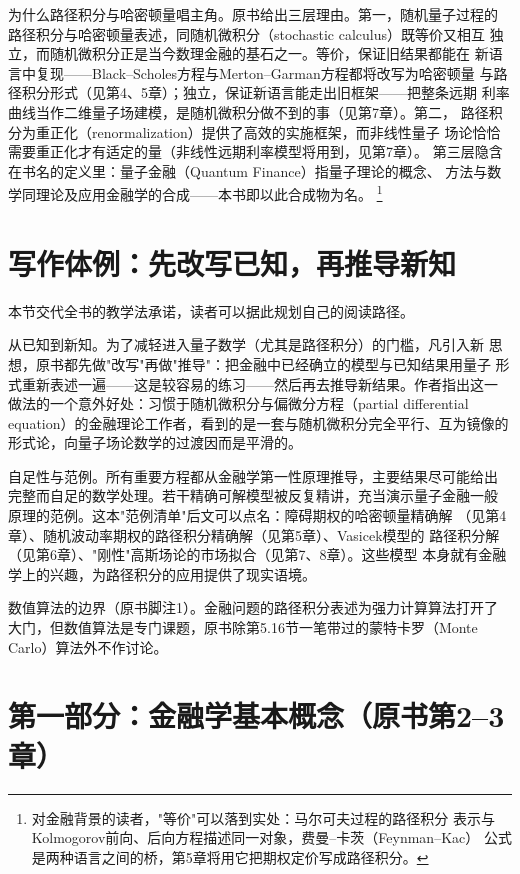 为什么路径积分与哈密顿量唱主角。原书给出三层理由。第一，随机量子过程的
路径积分与哈密顿量表述，同随机微积分（stochastic calculus）既等价又相互
独立，而随机微积分正是当今数理金融的基石之一。等价，保证旧结果都能在
新语言中复现——Black--Scholes方程与Merton--Garman方程都将改写为哈密顿量
与路径积分形式（见第4、5章）；独立，保证新语言能走出旧框架——把整条远期
利率曲线当作二维量子场建模，是随机微积分做不到的事（见第7章）。第二，
路径积分为重正化（renormalization）提供了高效的实施框架，而非线性量子
场论恰恰需要重正化才有适定的量（非线性远期利率模型将用到，见第7章）。
第三层隐含在书名的定义里：量子金融（Quantum Finance）指量子理论的概念、
方法与数学同理论及应用金融学的合成——本书即以此合成物为名。
\footnote{对金融背景的读者，"等价"可以落到实处：马尔可夫过程的路径积分
表示与Kolmogorov前向、后向方程描述同一对象，费曼--卡茨（Feynman--Kac）
公式是两种语言之间的桥，第5章将用它把期权定价写成路径积分。}

\section{写作体例：先改写已知，再推导新知}

本节交代全书的教学法承诺，读者可以据此规划自己的阅读路径。

从已知到新知。为了减轻进入量子数学（尤其是路径积分）的门槛，凡引入新
思想，原书都先做"改写"再做"推导"：把金融中已经确立的模型与已知结果用量子
形式重新表述一遍——这是较容易的练习——然后再去推导新结果。作者指出这一
做法的一个意外好处：习惯于随机微积分与偏微分方程（partial differential
equation）的金融理论工作者，看到的是一套与随机微积分完全平行、互为镜像的
形式论，向量子场论数学的过渡因而是平滑的。

自足性与范例。所有重要方程都从金融学第一性原理推导，主要结果尽可能给出
完整而自足的数学处理。若干精确可解模型被反复精讲，充当演示量子金融一般
原理的范例。这本"范例清单"后文可以点名：障碍期权的哈密顿量精确解
（见第4章）、随机波动率期权的路径积分精确解（见第5章）、Vasicek模型的
路径积分解（见第6章）、"刚性"高斯场论的市场拟合（见第7、8章）。这些模型
本身就有金融学上的兴趣，为路径积分的应用提供了现实语境。

数值算法的边界（原书脚注1）。金融问题的路径积分表述为强力计算算法打开了
大门，但数值算法是专门课题，原书除第5.16节一笔带过的蒙特卡罗（Monte
Carlo）算法外不作讨论。

\section{第一部分：金融学基本概念（原书第2--3章）}

